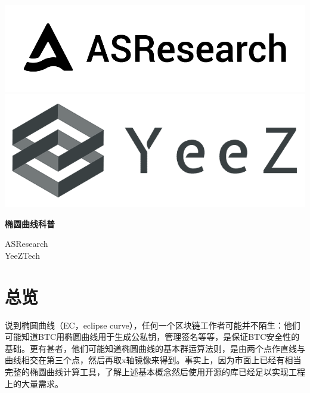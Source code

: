 \documentclass[12pt]{article}
\begin{document}
\pagestyle{empty}
\renewcommand{\contentsname}{目录}
\renewcommand{\abstractname}{摘要}
\renewcommand{\refname}{参考文献}
\renewcommand{\figurename}{图}
\renewcommand{\tablename}{表}
\renewcommand{\baselinestretch}{1.5}
\renewcommand{\appendixname}{附录}
\renewcommand{\proofname}{证明}

\pagecolor{\pcolor}



\begin{titlepage}
  \begin{center}
    \vspace*{2.5cm}
    \includegraphics[scale=0.2]{../common/logo.png}\\
    \includegraphics[scale=0.2]{../common/yeez.png}

    \vspace{3.5cm}




   \textbf{\huge{椭圆曲线科普}}

    \vspace{2.5cm}
    ASResearch\\
    YeeZTech
    \textbf{}
  \end{center}

\end{titlepage}
\setcounter{page}{0}
\tableofcontents
\newpage
\setcounter{page}{1}
\pagestyle{fancy}
\vspace*{0.01cm}

\section{总览}
说到椭圆曲线（EC，eclipse curve），任何一个区块链工作者可能并不陌生：他们可能知道BTC用椭圆曲线用于生成公私钥，管理签名等等，是保证BTC安全性的基础。更有甚者，他们可能知道椭圆曲线的基本群运算法则，是由两个点作直线与曲线相交在第三个点，然后再取x轴镜像来得到。事实上，因为市面上已经有相当完整的椭圆曲线计算工具，了解上述基本概念然后使用开源的库已经足以实现工程上的大量需求。
\end{document}

